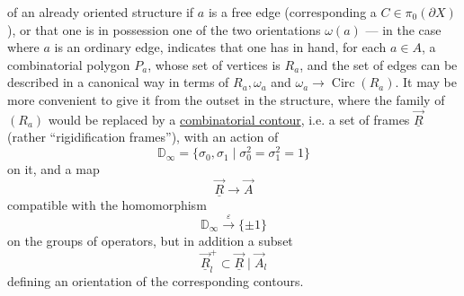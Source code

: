 of an already oriented structure if $a$ is a free edge
(corresponding  a $C\in\pi_0(\partial X)$), or that one is in possession
 one of the two orientations $\omega(a)$ ---
in the case where $a$ is an ordinary edge, indicates that one has in hand,
for each $a\in A$, a combinatorial polygon $P_a$, whose set of vertices
is $R_a$, and the set of edges can be described 
in a canonical way in terms of $R_a,\omega_a$ and
$\omega_a\longrightarrow\operatorname{Circ}(R_a)$.
It may be more convenient to give it from the outset in the structure,
where the family of $(R_a)$ would be replaced by a
\uline{combinatorial contour}, i.e. a set of frames
$\vec{\underline R}$ (rather ``rigidification frames''), with an action of
\[
 \mathbb D_\infty=\{\sigma_0,\sigma_1\mid\sigma_0^2=\sigma_1^2=1\}
\]
on it, and a map
\[
 \vec{\underline R}\longrightarrow\vec A
\]
compatible with the homomorphism
\[
 \mathbb D_\infty\xrightarrow{\varepsilon}\{\pm1\}
\]
on the groups of operators, but in addition a subset
\[
 \vec{\underline R}_l^+\subset\vec{\underline R}\mid\vec A_l
\]
defining an orientation of the corresponding contours.

